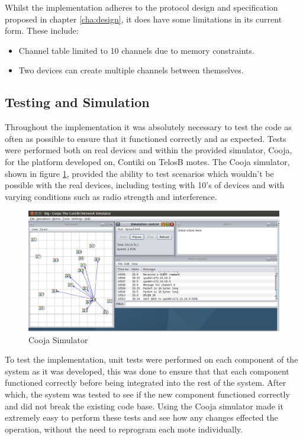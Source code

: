 Whilst the implementation adheres to the protocol design and specification proposed in chapter \ref{cha:design}, it does have some limitations in its current form. These include:
\begin{itemize}
 	\item Channel table limited to 10 channels due to memory constraints.
 	\item Two devices can create multiple channels between themselves. 
 \end{itemize} 



\subsection{Testing and Simulation} %
\label{sub:testing_and_simulation}
Throughout the implementation it was absolutely necessary to test the code as often as possible to ensure that it functioned correctly and as expected. Tests were performed both on real devices and within the provided simulator, Cooja, for the platform developed on, Contiki on TelosB motes. The Cooja simulator, shown in figure \ref{fig:simulator}, provided the ability to test scenarios which wouldn't be possible with the real devices, including testing with 10's of devices and with varying conditions such as radio strength and interference.

\begin{figure}[h!]
\centering
\includegraphics[scale=0.5]{implementation/img/cooja.jpg}
\caption{Cooja Simulator}
\label{fig:simulator}
\end{figure}

To test the implementation, unit tests were performed on each component of the system as it was developed, this was done to ensure that that each component functioned correctly before being integrated into the rest of the system. After which, the system was tested to see if the new component functioned correctly and did not break the existing code base. Using the Cooja simulator made it extremely easy to perform these tests and see how any changes effected the operation, without the need to reprogram each mote individually. 




